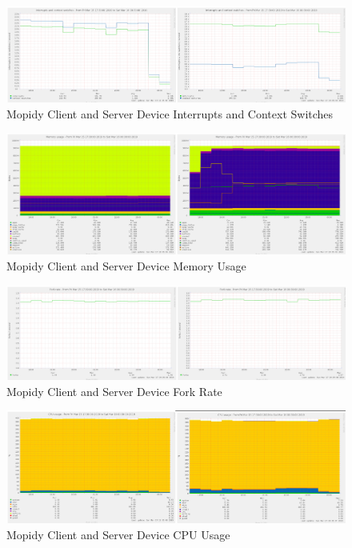 \documentclass[11pt,a4paper]{scrreprt}
\begin{document}
\begin{figure}[H]
\includegraphics{ResultsAndAnalysis/MopidyServerTestImages/015MopidyInterruptsAndContextSwitches.png}
\centering
\caption{Mopidy Client and Server Device Interrupts and Context Switches}
\label{MopidyIntCont}
\end{figure}

\begin{figure}[H]
\includegraphics{ResultsAndAnalysis/MopidyServerTestImages/017MopidyMemoryUsage.png}
\centering
\caption{Mopidy Client and Server Device Memory Usage}
\label{MopidyMemUse}
\end{figure}

\begin{figure}[H]
\includegraphics{ResultsAndAnalysis/MopidyServerTestImages/013MopidyForkRate.png}
\centering
\caption{Mopidy Client and Server Device Fork Rate}
\label{MopidyForkRate}
\end{figure}

\begin{figure}[H]
\includegraphics{ResultsAndAnalysis/MopidyServerTestImages/004MopidyCPUUsage.png}
\centering
\caption{Mopidy Client and Server Device CPU Usage}
\label{MopidyCPUUsage}
\end{figure}
\end{document}
